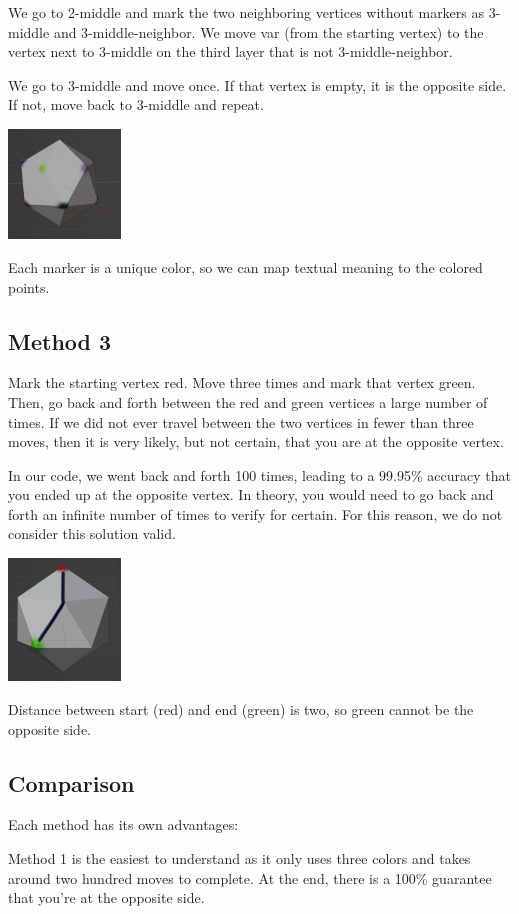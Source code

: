 \documentclass{article}
\begin{document}
We go to 2-middle and mark the two neighboring vertices without markers as 3-middle and 3-middle-neighbor. We move var (from the starting vertex) to the vertex next to 3-middle on the third layer that is not 3-middle-neighbor.

We go to 3-middle and move once. If that vertex is empty, it is the opposite side. If not, move back to 3-middle and repeat.

\includegraphics[width=3cm]{model2.jpg}
\caption{Each marker is a unique color, so we can map textual meaning to the colored points.}


\subsection{Method 3}
Mark the starting vertex red. Move three times and mark that vertex green. Then, go back and forth between the red and green vertices a large number of times. If we did not ever travel between the two vertices in fewer than three moves, then it is very likely, but not certain, that you are at the opposite vertex.

In our code, we went back and forth 100 times, leading to a 99.95\% accuracy that you ended up at the opposite vertex. In theory, you would need to go back and forth an infinite number of times to verify for certain. For this reason, we do not consider this solution valid.

\includegraphics[width=3cm]{model3.jpg}
\caption{Distance between start (red) and end (green) is
two, so green cannot be the opposite side.}

\subsection{Comparison}
Each method has its own advantages:

Method 1 is the easiest to understand as it only uses three colors and takes around two hundred moves to complete. At the end, there is a 100\% guarantee that you're at the opposite side.
\end{document}
